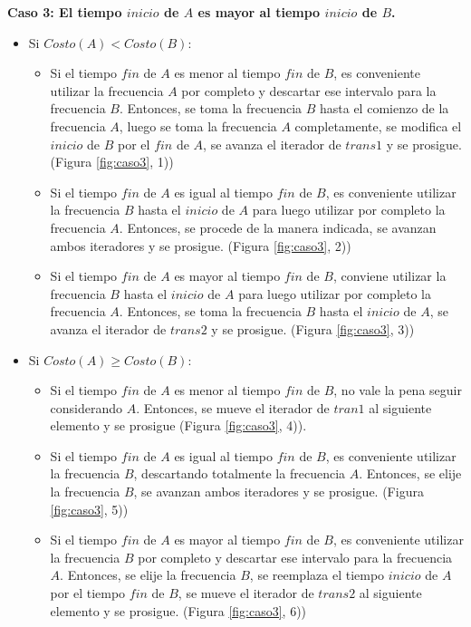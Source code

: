 {\bf Caso 3: El tiempo $inicio$ de $A$ es mayor al tiempo $inicio$ de $B$.}

\begin{itemize}
\item Si $Costo(A) < Costo(B)$:
	\begin{itemize}
	\item Si el tiempo $fin$ de $A$ es menor al tiempo $fin$ de $B$, es conveniente utilizar la frecuencia $A$ por completo y descartar ese intervalo para la frecuencia $B$. Entonces, se toma la frecuencia $B$ hasta el comienzo de la frecuencia $A$, luego se toma la frecuencia $A$ completamente, se modifica el $inicio$ de $B$ por el $fin$ de $A$, se avanza el iterador de $trans1$ y se prosigue. (Figura \ref{fig:caso3}, 1))
	\item Si el tiempo $fin$ de $A$ es igual al tiempo $fin$ de $B$, es conveniente utilizar la frecuencia $B$ hasta el $inicio$ de $A$ para luego utilizar por completo la frecuencia $A$. Entonces, se procede de la manera indicada, se avanzan ambos iteradores y se prosigue. (Figura \ref{fig:caso3}, 2))
	\item Si el tiempo $fin$ de $A$ es mayor al tiempo $fin$ de $B$, conviene utilizar la frecuencia $B$ hasta el $inicio$ de $A$ para luego utilizar por completo la frecuencia $A$.  Entonces, se toma la frecuencia $B$ hasta el $inicio$ de $A$, se avanza el iterador de $trans2$ y se prosigue. (Figura \ref{fig:caso3}, 3))
	\end{itemize}
\item Si $Costo(A) \geq Costo(B)$:
	\begin{itemize}
	\item Si el tiempo $fin$ de $A$ es menor al tiempo $fin$ de $B$, no vale la pena seguir considerando $A$. Entonces, se mueve el iterador de $tran1$ al siguiente elemento y se prosigue (Figura \ref{fig:caso3}, 4)). 		\item Si el tiempo $fin$ de $A$ es igual al tiempo $fin$ de $B$, es conveniente utilizar la frecuencia $B$, descartando totalmente la frecuencia $A$.  Entonces, se elije la frecuencia $B$, se avanzan ambos iteradores y se prosigue. (Figura \ref{fig:caso3}, 5))
	\item Si el tiempo $fin$ de $A$ es mayor al tiempo $fin$ de $B$, es conveniente utilizar la frecuencia $B$ por completo y descartar ese intervalo para la frecuencia $A$. Entonces, se elije la frecuencia $B$, se reemplaza el tiempo $inicio$ de $A$ por el tiempo $fin$ de $B$, se mueve el iterador de $trans2$ al siguiente elemento y se prosigue. (Figura \ref{fig:caso3}, 6))
	\end{itemize}
\end{itemize}

